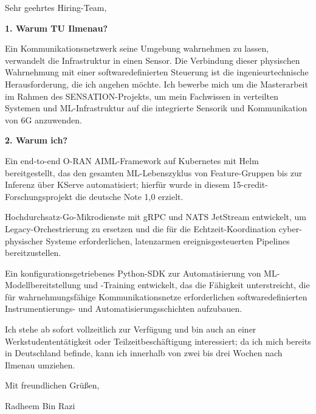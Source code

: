 \documentclass[11pt,a4paper]{coverletter}
\begin{document}
\opening{Sehr geehrtes Hiring-Team,}

\vspace{8pt}\noindent\textbf{1. Warum TU Ilmenau?}\par\vspace{3pt}

Ein Kommunikationsnetzwerk seine Umgebung wahrnehmen zu lassen, verwandelt die Infrastruktur in einen Sensor. Die Verbindung dieser physischen Wahrnehmung mit einer softwaredefinierten Steuerung ist die ingenieurtechnische Herausforderung, die ich angehen möchte. Ich bewerbe mich um die Masterarbeit im Rahmen des SENSATION-Projekts, um mein Fachwissen in verteilten Systemen und ML-Infrastruktur auf die integrierte Sensorik und Kommunikation von 6G anzuwenden.

\vspace{8pt}\noindent\textbf{2. Warum ich?}\par\vspace{3pt}

\bullets

  \item Ein end-to-end O-RAN AIML-Framework auf Kubernetes mit Helm bereitgestellt, das den gesamten ML-Lebenszyklus von Feature-Gruppen bis zur Inferenz über KServe automatisiert; hierfür wurde in diesem 15-credit-Forschungsprojekt die deutsche Note 1,0 erzielt.

  \item Hochdurchsatz-Go-Mikrodienste mit gRPC und NATS JetStream entwickelt, um Legacy-Orchestrierung zu ersetzen und die für die Echtzeit-Koordination cyber-physischer Systeme erforderlichen, latenzarmen ereignisgesteuerten Pipelines bereitzustellen.

  \item Ein konfigurationsgetriebenes Python-SDK zur Automatisierung von ML-Modellbereitstellung und -Training entwickelt, das die Fähigkeit unterstreicht, die für wahrnehmungsfähige Kommunikationsnetze erforderlichen softwaredefinierten Instrumentierungs- und Automatisierungsschichten aufzubauen.

\bulletsend

Ich stehe ab sofort vollzeitlich zur Verfügung und bin auch an einer Werkstudententätigkeit oder Teilzeitbeschäftigung interessiert; da ich mich bereits in Deutschland befinde, kann ich innerhalb von zwei bis drei Wochen nach Ilmenau umziehen.

\closing{Mit freundlichen Grüßen,}{Radheem Bin Razi}
\end{document}
